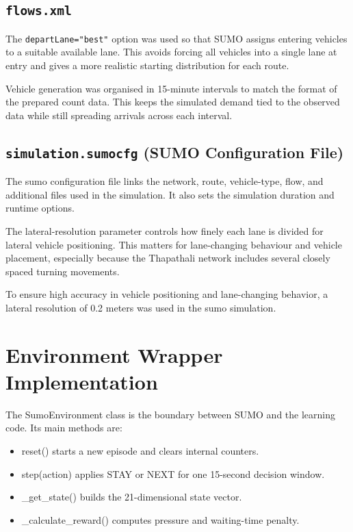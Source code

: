 \subsection{\texttt{flows.xml}}
\label{subsec:flows_xml}
The \texttt{departLane="best"} option was used so that SUMO assigns
entering vehicles to a suitable available lane. This avoids forcing all
vehicles into a single lane at entry and gives a more realistic starting
distribution for each route.

Vehicle generation was organised in 15-minute intervals to match the
format of the prepared count data. This keeps the simulated demand tied
to the observed data while still spreading arrivals across each interval.

\subsection{\texttt{simulation.sumocfg} (SUMO Configuration File)}
\label{subsec:sumocfg}
The \gls{sumo} configuration file links the network, route, vehicle-type,
flow, and additional files used in the simulation. It also sets the
simulation duration and runtime options.

The lateral-resolution parameter controls how finely each lane is divided
for lateral vehicle positioning. This matters for lane-changing behaviour
and vehicle placement, especially because the Thapathali network includes
several closely spaced turning movements.

To ensure high accuracy in vehicle positioning and lane-changing behavior, a lateral resolution of 0.2 meters was used in the \gls{sumo} simulation.

\section{Environment Wrapper Implementation}
\label{sec:env_wrapper}

The SumoEnvironment class is the boundary between SUMO and the learning
code. Its main methods are:

\begin{itemize}
    \item reset() starts a new episode and clears internal counters.
    \item step(action) applies STAY or NEXT for one 15-second decision window.
    \item \_get\_state() builds the 21-dimensional state vector.
    \item \_calculate\_reward() computes pressure and waiting-time penalty.
\end{itemize}

